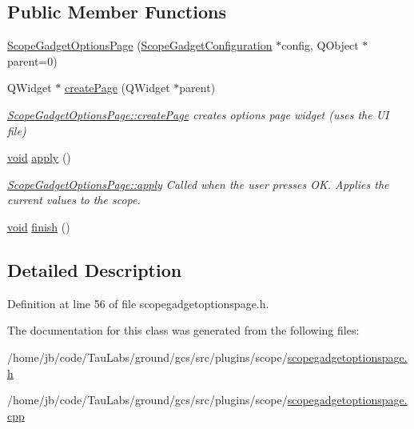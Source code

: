 \subsection*{\-Public \-Member \-Functions}
\begin{DoxyCompactItemize}
\item 
\hyperlink{group___scope_plugin_ga3680539fc8bb7716884d7e3da9caff3a}{\-Scope\-Gadget\-Options\-Page} (\hyperlink{class_scope_gadget_configuration}{\-Scope\-Gadget\-Configuration} $\ast$config, \-Q\-Object $\ast$parent=0)
\item 
\-Q\-Widget $\ast$ \hyperlink{group___scope_plugin_ga4032bc264c49c13a4bf81d5835a33206}{create\-Page} (\-Q\-Widget $\ast$parent)
\begin{DoxyCompactList}\small\item\em \hyperlink{group___scope_plugin_ga4032bc264c49c13a4bf81d5835a33206}{\-Scope\-Gadget\-Options\-Page\-::create\-Page} creates options page widget (uses the \-U\-I file) \end{DoxyCompactList}\item 
\hyperlink{group___u_a_v_objects_plugin_ga444cf2ff3f0ecbe028adce838d373f5c}{void} \hyperlink{group___scope_plugin_gaf046ff419274a440bbca457fd018c3e1}{apply} ()
\begin{DoxyCompactList}\small\item\em \hyperlink{group___scope_plugin_gaf046ff419274a440bbca457fd018c3e1}{\-Scope\-Gadget\-Options\-Page\-::apply} \-Called when the user presses \-O\-K. \-Applies the current values to the scope. \end{DoxyCompactList}\item 
\hyperlink{group___u_a_v_objects_plugin_ga444cf2ff3f0ecbe028adce838d373f5c}{void} \hyperlink{group___scope_plugin_ga106935101fc319a034138e2c37c02f8c}{finish} ()
\end{DoxyCompactItemize}


\subsection{\-Detailed \-Description}


\-Definition at line 56 of file scopegadgetoptionspage.\-h.



\-The documentation for this class was generated from the following files\-:\begin{DoxyCompactItemize}
\item 
/home/jb/code/\-Tau\-Labs/ground/gcs/src/plugins/scope/\hyperlink{scopegadgetoptionspage_8h}{scopegadgetoptionspage.\-h}\item 
/home/jb/code/\-Tau\-Labs/ground/gcs/src/plugins/scope/\hyperlink{scopegadgetoptionspage_8cpp}{scopegadgetoptionspage.\-cpp}\end{DoxyCompactItemize}
